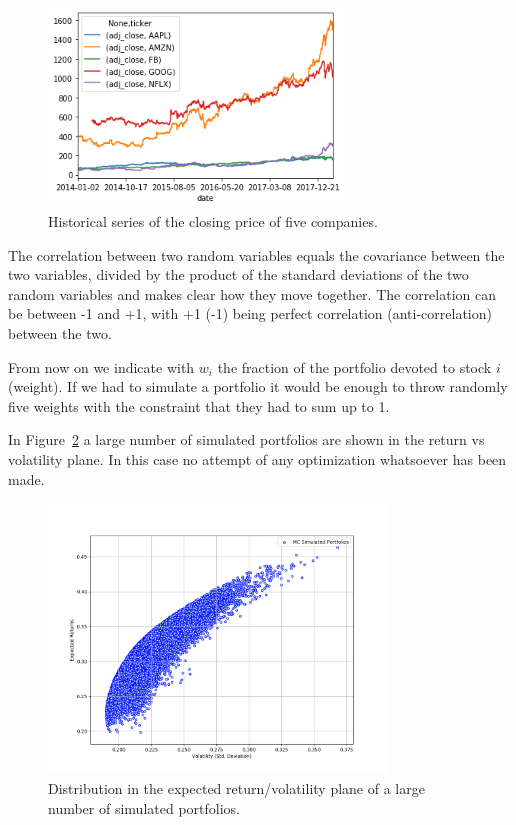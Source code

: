 \begin{figure}[htb]
\centering
\includegraphics[width=0.7\textwidth]{figures/portfolio_sample}
\caption{Historical series of the closing price of five companies.}
\label{fig:stocks}
\end{figure}
    
The correlation between two random variables equals the
covariance between the two variables, divided by the product of the
standard deviations of the two random variables and makes clear how they
move together. The correlation can be
between -1 and +1, with +1 (-1) being perfect correlation
(anti-correlation) between the two.

From now on we indicate with $w_i$ the fraction of the portfolio devoted to stock $i$ (weight).
If we had to simulate a portfolio it would be enough to throw randomly five weights with the constraint that they had to sum up to 1. 

In Figure~\ref{fig:mc_portfolio} a large number of simulated portfolios are shown in the return vs volatility plane. In this case no attempt of any optimization whatsoever has been made.

\begin{figure}[hbt]
\centering
\includegraphics[width=0.8\textwidth]{figures/return_variance}
\caption{Distribution in the expected return/volatility plane of a large number of simulated portfolios.}
\label{fig:mc_portfolio}
\end{figure}

